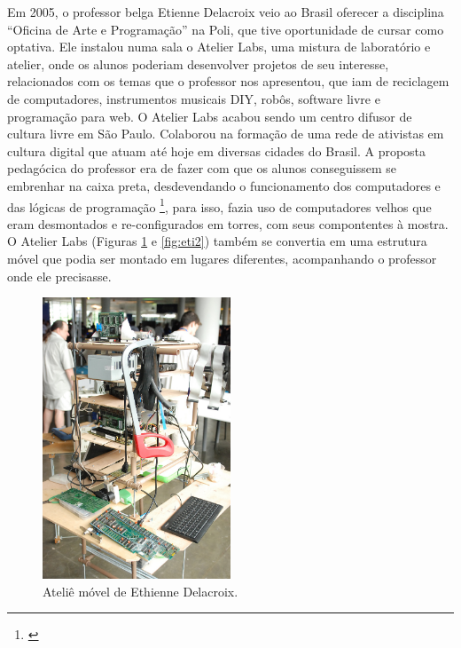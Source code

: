 Em 2005, o professor belga Etienne Delacroix veio ao Brasil oferecer a disciplina ``Oficina de Arte e Programação'' na Poli, que tive oportunidade de cursar como optativa. Ele instalou numa sala o Atelier Labs, uma mistura de laboratório e atelier, onde os alunos poderiam desenvolver projetos de seu interesse, relacionados com os temas que o professor nos apresentou, que iam de reciclagem de computadores, instrumentos musicais DIY, robôs, software livre e programação para web. O Atelier Labs acabou sendo um  centro difusor de cultura livre em São Paulo. Colaborou na formação de uma rede de ativistas em cultura digital que atuam até hoje em diversas cidades do Brasil. A proposta pedagócica do professor era de fazer com que os alunos conseguissem se embrenhar na caixa preta, desdevendando o funcionamento dos computadores e das lógicas de programação \footnote{\cite{Delacroix2009}}, para isso, fazia uso de computadores velhos que eram desmontados e re-configurados em torres, com seus compontentes à mostra. O Atelier Labs (Figuras \ref{fig:eti} e \ref{fig:eti2}) também se convertia em uma estrutura móvel que podia ser montado em lugares diferentes, acompanhando o professor onde ele precisasse.

\begin{figure}

\includegraphics[width=0.5\textwidth]{pictures/cap1/eti1}
\caption{Ateliê móvel de Ethienne Delacroix.}
\label{fig:eti}
\end{figure}

